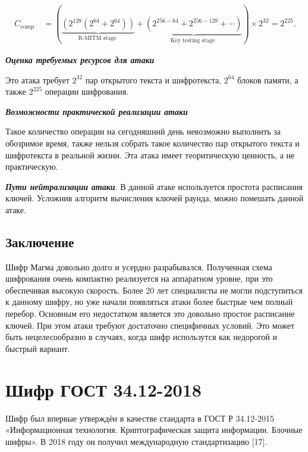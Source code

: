 \documentclass[colorthm]{./civarticle}
\begin{document}
\begin{equation}
    \begin{aligned}
C_{\text {comp }} & =(\underbrace{\left(2^{128}\left(2^{64}+2^{64}\right)\right)}_{\text {R-MITM stage }}+\underbrace{\left(2^{256-64}+2^{256-128}+\cdots\right)}_{\text {Key testing stage }}) \times 2^{32}=2^{225} .
\end{aligned}
\end{equation}

\textbf{\emph{Оценка требуемых ресурсов для атаки}}

Это атака требует $2^{32}$ пар открытого текста и шифротекста, $2^{64}$ блоков памяти, а также $2^{225}$ операции шифрования.

\textbf{\emph{Возможности практической реализации атаки}}

Такое количество операции на сегодняшний день невозможно выполнить за обозримое время, также нельзя собрать такое количество пар открытого текста и шифротекста в реальной жизни. Эта атака имеет теоритическую ценность, а не практическую.

\textbf{\emph{Пути нейтрализации атаки}}. В данной атаке используется простота расписания ключей. Усложнив алгоритм вычисления ключей раунда, можно помешать данной атаке.

\subsection{Заключение}
Шифр Магма довольно долго и усердно разрабывался. Полученная схема шифрования очень компактно реализуется на аппаратном уровне, при это обеспечивая высокую скорость. Более 20 лет специалисты не могли подступиться к данному шифру, но уже начали появляться атаки более быстрые чем полный перебор. Основным его недостатком является это довольно простое расписание ключей. При этом атаки требуют достаточно специфичных условий. Это может быть нецелесообразно в случаях, когда шифр использутся как недорогой и быстрый вариант.

\section{Шифр ГОСТ 34.12-2018 \textquotedbl}

Шифр \textquotedbl был впервые утверждён  в качестве стандарта в ГОСТ Р 34.12-2015 «Информационная технология. Криптографическая защита информации. Блочные шифры». В 2018 году он получил международную стандартизацию [17]. 
\end{document}
